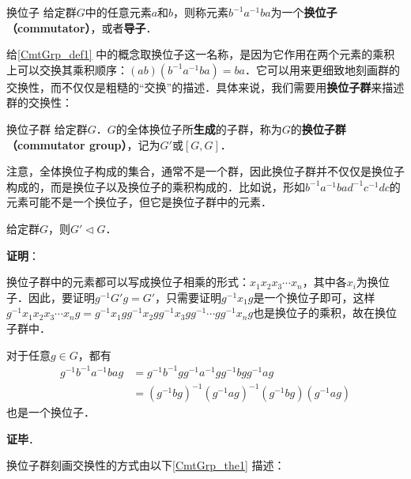 


\begin{definition}{换位子}\label{CmtGrp_def1}
给定群$G$中的任意元素$a$和$b$，则称元素$b^{-1}a^{-1}ba$为一个\textbf{换位子（commutator）}，或者\textbf{导子}．
\end{definition}

给\autoref{CmtGrp_def1} 中的概念取换位子这一名称，是因为它作用在两个元素的乘积上可以交换其乘积顺序：$(ab)(b^{-1}a^{-1}ba)=ba$．它可以用来更细致地刻画群的交换性，而不仅仅是粗糙的“交换”的描述．具体来说，我们需要用\textbf{换位子群}来描述群的交换性：

\begin{definition}{换位子群}
给定群$G$．$G$的全体换位子所\textbf{生成}的子群，称为$G$的\textbf{换位子群（commutator group）}，记为$G'$或$[G, G]$．
\end{definition}

注意，全体换位子构成的集合，通常不是一个群，因此换位子群并不仅仅是换位子构成的，而是换位子以及换位子的乘积构成的．比如说，形如$b^{-1}a^{-1}bad^{-1}c^{-1}dc$的元素可能不是一个换位子，但它是换位子群中的元素．

\begin{theorem}{}
给定群$G$，则$G'\triangleleft G$．
\end{theorem}

\textbf{证明}：

换位子群中的元素都可以写成换位子相乘的形式：$x_1x_2x_3\cdots x_n$，其中各$x_i$为换位子．因此，要证明$g^{-1}G'g=G'$，只需要证明$g^{-1}x_1g$是一个换位子即可，这样$g^{-1}x_1x_2x_3\cdots x_ng=g^{-1}x_1gg^{-1}x_2gg^{-1}x_3gg^{-1}\cdots gg^{-1}x_ng$也是换位子的乘积，故在换位子群中．

对于任意$g\in G$，都有
\begin{equation}
\begin{aligned}
g^{-1}b^{-1}a^{-1}bag&=g^{-1}b^{-1}gg^{-1}a^{-1}gg^{-1}bgg^{-1}ag\\
&=(g^{-1}bg)^{-1}(g^{-1}ag)^{-1}(g^{-1}bg)(g^{-1}ag)
\end{aligned}
\end{equation}
也是一个换位子．

\textbf{证毕}．

换位子群刻画交换性的方式由以下\autoref{CmtGrp_the1} 描述：

\begin{theorem}{}\label{CmtGrp_the1}

\end{theorem}















